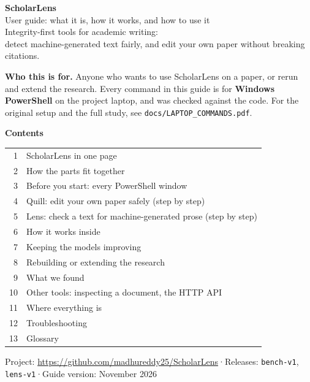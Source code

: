 \documentclass[11pt]{article}
\newcommand{\cm}[1]{\texttt{#1}}
\begin{document}
\thispagestyle{empty}
\vspace*{2.5cm}
{\color{accent}\fontsize{34}{40}\selectfont\bfseries ScholarLens}\\[6pt]
{\Large User guide: what it is, how it works, and how to use it}\\[18pt]
{\large Integrity-first tools for academic writing:\\
detect machine-generated text fairly, and edit your own paper without breaking citations.}

\vspace{1.2cm}
\begin{note}
\textbf{Who this is for.} Anyone who wants to use ScholarLens on a paper, or rerun and extend the research.
Every command in this guide is for \textbf{Windows PowerShell} on the project laptop, and was checked against the code.
For the original setup and the full study, see \cm{docs/LAPTOP\_COMMANDS.pdf}.
\end{note}

\vspace{0.6cm}
{\large\bfseries\color{accent} Contents}\\[4pt]
\begin{tabular}{@{}rl@{}}
1 & ScholarLens in one page \\
2 & How the parts fit together \\
3 & Before you start: every PowerShell window \\
4 & Quill: edit your own paper safely (step by step) \\
5 & Lens: check a text for machine-generated prose (step by step) \\
6 & How it works inside \\
7 & Keeping the models improving \\
8 & Rebuilding or extending the research \\
9 & What we found \\
10 & Other tools: inspecting a document, the HTTP API \\
11 & Where everything is \\
12 & Troubleshooting \\
13 & Glossary \\
\end{tabular}

\vfill
{\small\color{gray} Project: \url{https://github.com/madhureddy25/ScholarLens}\quad·\quad Releases: \cm{bench-v1}, \cm{lens-v1}\quad·\quad Guide version: November 2026}
\newpage
\end{document}
